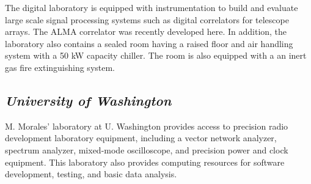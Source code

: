 \documentclass[11pt]{article}
\begin{document}
The digital laboratory is equipped with instrumentation to build and evaluate
large scale signal processing systems such as digital correlators for telescope
arrays. The ALMA correlator was recently developed here. In addition, the
laboratory also contains a sealed room having a raised floor and air handling
system with a 50 kW capacity chiller. The room is also equipped with a an inert
gas fire extinguishing system.

\subsection{\it University of Washington}

M. Morales' laboratory at U. Washington provides access to precision radio
development laboratory equipment, including
a vector network analyzer, spectrum analyzer, mixed-mode oscilloscope, and
precision power and clock equipment.  This laboratory also provides computing
resources for software development, testing, and basic data analysis.
\end{document}
